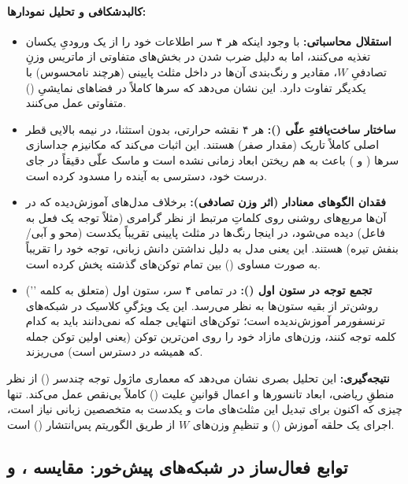 \documentclass{article}
\begin{document}
\paragraph{کالبدشکافی و تحلیل نمودارها:}
\begin{itemize}
	\item \textbf{استقلال محاسباتی:} با وجود اینکه هر ۴ سر اطلاعات خود را از یک ورودیِ یکسان تغذیه می‌کنند، اما به دلیل ضرب شدن در بخش‌های متفاوتی از ماتریس وزنِ تصادفیِ $W$، مقادیر و رنگ‌بندی آن‌ها در داخل مثلث پایینی (هرچند نامحسوس) با یکدیگر تفاوت دارد. این نشان می‌دهد که سرها کاملاً در فضاهای نمایشیِ () متفاوتی عمل می‌کنند.
	
	\item \textbf{ساختار ساخت‌یافتهِ علّی ():} هر ۴ نقشه حرارتی، بدون استثنا، در نیمه بالایی قطر اصلی کاملاً تاریک (مقدار صفر) هستند. این اثبات می‌کند که مکانیزم جداسازی سرها ( و ) باعث به هم ریختن ابعاد زمانی نشده است و ماسک علّی دقیقاً در جای درست خود، دسترسی به آینده را مسدود کرده است.
	
	\item \textbf{فقدان الگوهای معنادار (اثر وزن تصادفی):} برخلاف مدل‌های آموزش‌دیده که در آن‌ها مربع‌های روشنی روی کلماتِ مرتبط از نظر گرامری (مثلاً توجه یک فعل به فاعل) دیده می‌شود، در اینجا رنگ‌ها در مثلث پایینی تقریباً یکدست (محو و آبی/بنفش تیره) هستند. این یعنی مدل به دلیل نداشتن دانش زبانی، توجه خود را تقریباً به صورت مساوی () بین تمام توکن‌های گذشته پخش کرده است.
	
	\item \textbf{تجمع توجه در ستون اول ():} در تمامی ۴ سر، ستون اول (متعلق به کلمه '') روشن‌تر از بقیه ستون‌ها به نظر می‌رسد. این یک ویژگیِ کلاسیک در شبکه‌های ترنسفورمر آموزش‌ندیده است؛ توکن‌های انتهایی جمله که نمی‌دانند باید به کدام کلمه توجه کنند، وزن‌های مازاد خود را روی امن‌ترین توکن (یعنی اولین توکن جمله که همیشه در دسترس است) می‌ریزند.
\end{itemize}

\textbf{نتیجه‌گیری:} این تحلیل بصری نشان می‌دهد که معماری ماژول توجه چندسر () از نظر منطقِ ریاضی، ابعاد تانسورها و اعمال قوانینِ علیت () کاملاً بی‌نقص عمل می‌کند. تنها چیزی که اکنون برای تبدیل این مثلث‌های مات و یکدست به متخصصین زبانی نیاز است، اجرای یک حلقه آموزش () و تنظیمِ وزن‌های $W$ از طریق الگوریتم پس‌انتشار () است.


\subsection{توابع فعال‌ساز در شبکه‌های پیش‌خور: مقایسه ،  و }
\end{document}

